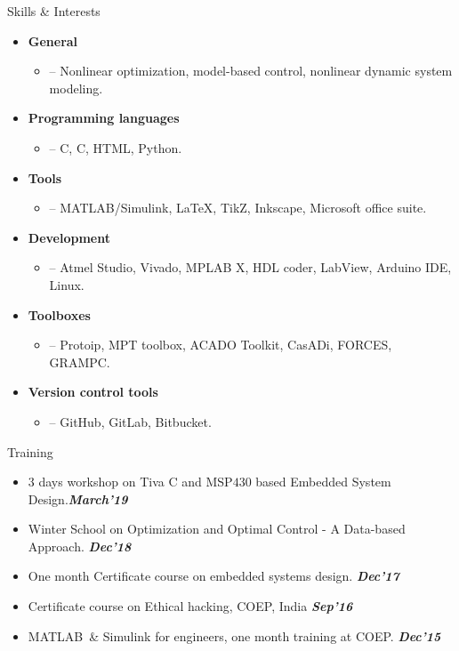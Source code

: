 \documentclass[11pt]{resume}
\newcommand{\mt}{\textsc{MATLAB}}
\newcommand\cpp{C\nolinebreak[4]\hspace{-.05em}\raisebox{.4ex}{\relsize{-3}{\textbf{++}}}}
\newcommand\cp{C\nolinebreak[4]\hspace{-.05em}\raisebox{.4ex}{\relsize{-3}{\textbf{}}}}
\newenvironment{outerlist}[1][\enskip\textbullet]%
{\begin{itemize}[#1,leftmargin=*]}{\end{itemize}%
	\vspace{-.5\baselineskip}}
\newenvironment{innerlist}[1][\enskip\textbullet]%
{\begin{itemize}[#1,leftmargin=*,parsep=0pt,itemsep=0pt,topsep=0pt,partopsep=0pt]}
	{\end{itemize}}
\begin{document}
\begin{rSection}{Skills \& Interests}
\begin{outerlist}
	\item \textbf{General} 
		\begin{innerlist}
			\item[--] Nonlinear optimization, model-based control, nonlinear dynamic system modeling. 
		\end{innerlist}
	\item \textbf{Programming languages}
		\begin{innerlist}
			\item[--] \cp, \cpp, HTML, Python.
		\end{innerlist}
	\item \textbf{Tools}
		\begin{innerlist}
			\item[--] \mt/Simulink, \LaTeX, TikZ, Inkscape, Microsoft office suite.
		\end{innerlist}
	\item \textbf{Development}
		\begin{innerlist}
			\item[--] Atmel Studio, Vivado, MPLAB X,  HDL coder, LabView, Arduino IDE, Linux.
		\end{innerlist}
	\item \textbf{Toolboxes}
		\begin{innerlist}
			\item[--] Protoip, MPT toolbox, ACADO Toolkit, CasADi, FORCES, GRAMPC.
		\end{innerlist}
	\item \textbf{Version control tools}
		\begin{innerlist}
			\item[--] GitHub, GitLab, Bitbucket.
		\end{innerlist}
\end{outerlist}
\end{rSection}
\vspace{8mm}
\begin{rSection}{Training}
	\begin{outerlist}
		\item $3$ days workshop on Tiva C and MSP$ 430 $ based Embedded System Design.\hfill \textit{\textbf{March'19}}
		\item Winter School on Optimization and Optimal Control - A Data-based Approach. \hfill \textit{\textbf{Dec'18}}		
		\item One month Certificate course on embedded systems design. \hfill \textit{\textbf{Dec'17}}		
		\item Certificate course on Ethical hacking, COEP, India \hfill \textit{\textbf{Sep'16}}
		\item \mt~\& Simulink for engineers, one month training at COEP. \hfill \textit{\textbf{Dec'15}}		
	\end{outerlist}
\end{rSection}
\end{document}
